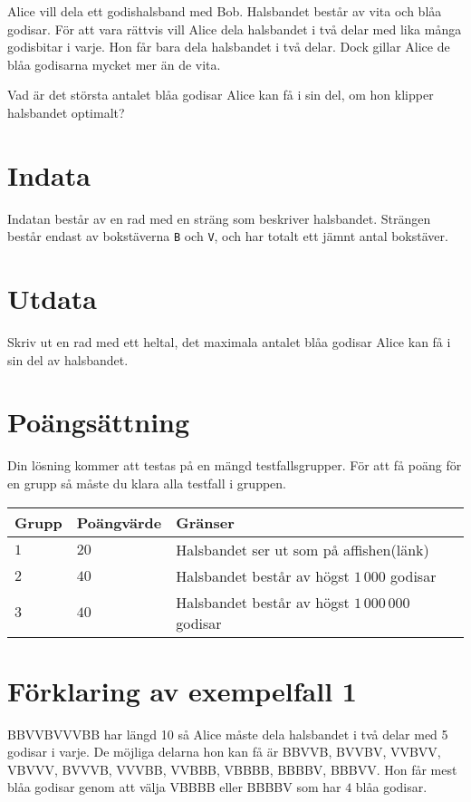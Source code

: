 Alice vill dela ett godishalsband med Bob.
Halsbandet består av vita och blåa godisar.
För att vara rättvis vill Alice dela halsbandet i två
delar med lika många godisbitar i varje.
Hon får bara dela halsbandet i två delar.
Dock gillar Alice de blåa godisarna mycket mer än de vita.

Vad är det största antalet blåa godisar Alice kan få i sin del,
om hon klipper halsbandet optimalt?

\section*{Indata}
Indatan består av en rad med en sträng som beskriver halsbandet.
Strängen består endast av bokstäverna \texttt{B} och \texttt{V},
och har totalt ett jämnt antal bokstäver.

\section*{Utdata}
Skriv ut en rad med ett heltal, det maximala antalet blåa godisar Alice
kan få i sin del av halsbandet.

\section*{Poängsättning}
Din lösning kommer att testas på en mängd testfallsgrupper.
För att få poäng för en grupp så måste du klara alla testfall i gruppen.

\noindent
\begin{tabular}{| l | l | l |}
\hline
Grupp & Poängvärde & Gränser \\ \hline
$1$   & $20$       & Halsbandet ser ut som på affishen(länk) \\ \hline
$2$   & $40$       & Halsbandet består av högst $1\,000$ godisar\\ \hline
$3$   & $40$       & Halsbandet består av högst $1\,000\,000$ godisar \\ \hline
\end{tabular}

\section*{Förklaring av exempelfall 1}
BBVVBVVVBB har längd 10 så Alice måste dela halsbandet i två delar med 5 godisar i varje.
De möjliga delarna hon kan få är BBVVB, BVVBV, VVBVV, VBVVV, BVVVB, VVVBB, VVBBB, VBBBB, BBBBV, BBBVV.
Hon får mest blåa godisar genom att välja VBBBB eller BBBBV som har $4$ blåa godisar.
